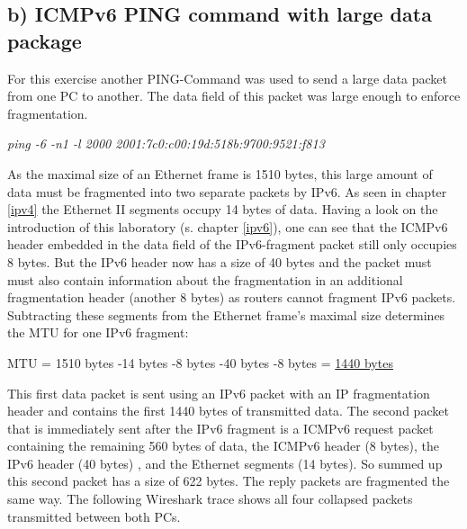 \subsection{b) ICMPv6 PING command with large data package}
\label{ipv6-fragmentation}
For this exercise another PING-Command was used to send a large data packet from one PC to another. The data field of this packet was large enough to enforce fragmentation.
\begin{center}
	\textit{ping -6 -n1 -l 2000 2001:7c0:c00:19d:518b:9700:9521:f813}
\end{center}
As the maximal size of an Ethernet frame is 1510 bytes, this large amount of data must be fragmented into two separate packets by IPv6. As seen in chapter \ref{ipv4} the Ethernet II segments occupy 14 bytes of data. Having a look on the introduction of this laboratory (s. chapter \ref{ipv6}), one can see that the ICMPv6 header embedded in the data field of the IPv6-fragment packet still only occupies 8 bytes. But the IPv6 header now has a size of 40 bytes and the packet must must also contain information about the fragmentation in an additional fragmentation header (another 8 bytes) as routers cannot fragment IPv6 packets. Subtracting these segments from the Ethernet frame's maximal size determines the MTU for one IPv6 fragment:
\begin{center}
	MTU = 1510 bytes -14 bytes -8 bytes -40 bytes -8 bytes
		= \underline{1440 bytes} 
\end{center} 
This first data packet is sent using an IPv6 packet with an IP fragmentation header and contains the first 1440 bytes of transmitted data. The second packet that is immediately sent after the IPv6 fragment is a ICMPv6 request packet containing the remaining 560 bytes of data, the ICMPv6 header (8 bytes), the IPv6 header (40 bytes) , and the Ethernet segments (14 bytes). So summed up this second packet has a size of 622 bytes. The reply packets are fragmented the same way. The following Wireshark trace shows all four collapsed packets transmitted between both PCs.
\\
